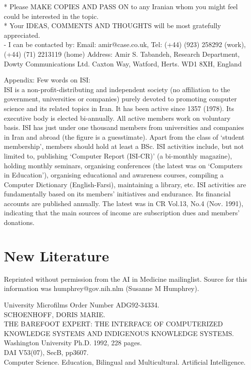 * Please MAKE COPIES AND PASS ON to any Iranian whom you might feel could be 
  interested in the topic.\\
* Your IDEAS, COMMENTS AND THOUGHTS will be most gratefully appreciated.\\
- I can be contacted by: Email: amir@case.co.uk, Tel: (+44) (923)
258292 (work), (+44) (71) 2213119 (home) Address: Amir S. Tabandeh,
Research Department, Dowty Communications Ltd.
Caxton Way, Watford, Herts.  WD1  8XH, England

Appendix: Few words on ISI:\\
ISI is a non-profit-distributing and independent society (no affiliation to 
the government, universities or companies) purely devoted to promoting 
computer science and its related topics in Iran. It has been active since 1357
(1978). Its executive body is elected bi-annually. All active members work on
voluntary basis.  ISI has just under one thousand members from universities 
and companies in Iran and abroad (the figure is a guesstimate). Apart from the
class of `student membership', members should hold at least a BSc.  ISI 
activities include, but not limited to, publishing `Computer Report (ISI-CR)'
(a bi-monthly magazine), holding monthly seminars, organising conferences 
(the latest was on `Computers in Education'), organising educational and 
awareness courses, compiling a Computer Dictionary (English-Farsi), 
maintaining a library, etc. ISI activities are fundamentally based on its 
members' initiatives and endurance.  Its financial accounts are published 
annually. The latest was in CR Vol.13, No.4 (Nov. 1991), indicating that the 
main sources of income are subscription dues and members' donations.

\section{New Literature}
Reprinted without permission from the AI in Medicine mailinglist.
Source for this information was humphrey@gov.nih.nlm (Susanne M
Humphrey). 

 University Microfilms Order Number ADG92-34334.\\
 SCHOENHOFF, DORIS MARIE.\\
 THE BAREFOOT EXPERT: THE INTERFACE OF COMPUTERIZED KNOWLEDGE SYSTEMS
   AND INDIGENOUS KNOWLEDGE SYSTEMS.\\
 Washington University Ph.D. 1992, 228 pages.\\
 DAI V53(07), SecB, pp3607.\\
 Computer Science.  Education, Bilingual and Multicultural.
   Artificial Intelligence.\\


